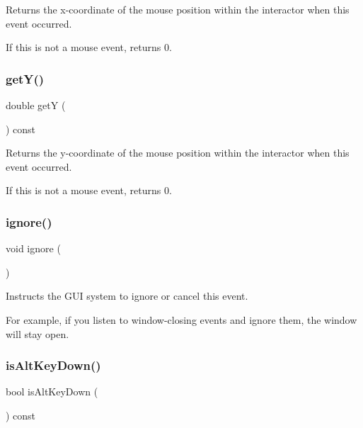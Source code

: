 Returns the x-\/coordinate of the mouse position within the interactor when this event occurred. 

If this is not a mouse event, returns 0. \mbox{\label{classsgl_1_1GEvent_aafa51c7f8f38a09febbb9ce7853f77b4}} 
\subsubsection{\texorpdfstring{get\+Y()}{getY()}}
{\footnotesize\ttfamily double getY (\begin{DoxyParamCaption}{ }\end{DoxyParamCaption}) const\hspace{0.3cm}{\ttfamily [virtual]}}



Returns the y-\/coordinate of the mouse position within the interactor when this event occurred. 

If this is not a mouse event, returns 0. \mbox{\label{classsgl_1_1GEvent_a1d8bbef538fb750723bcc8f3cbc77720}} 
\subsubsection{\texorpdfstring{ignore()}{ignore()}}
{\footnotesize\ttfamily void ignore (\begin{DoxyParamCaption}{ }\end{DoxyParamCaption})\hspace{0.3cm}{\ttfamily [virtual]}}



Instructs the G\+UI system to ignore or cancel this event. 

For example, if you listen to window-\/closing events and ignore them, the window will stay open. \mbox{\label{classsgl_1_1GEvent_ac5cfd7d64f7bc3d43c4ce4326f213ab5}} 
\subsubsection{\texorpdfstring{is\+Alt\+Key\+Down()}{isAltKeyDown()}}
{\footnotesize\ttfamily bool is\+Alt\+Key\+Down (\begin{DoxyParamCaption}{ }\end{DoxyParamCaption}) const\hspace{0.3cm}{\ttfamily [virtual]}}



